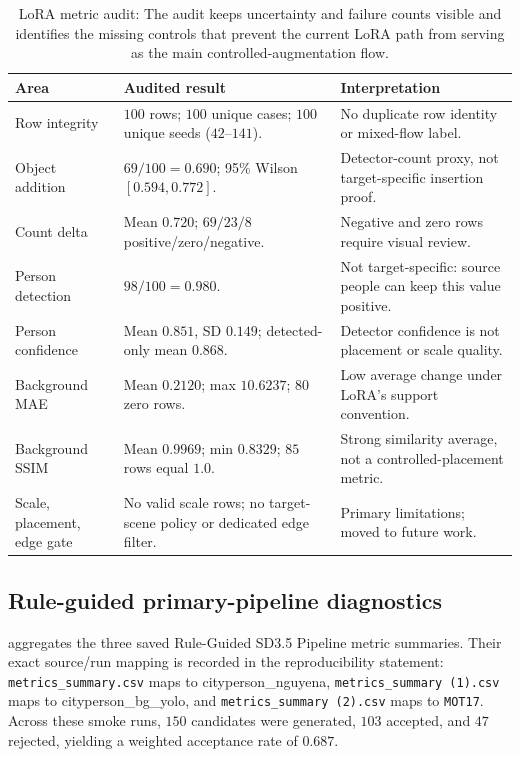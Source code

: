 \documentclass[11pt,a4paper]{article}
\newcommand{\rgp}{Rule-Guided SD3.5 Pipeline\xspace}  %
\begin{document}
\begin{table}[t]
  \centering
  \caption[Audited LoRA shared metrics]{{LoRA metric audit:} The audit keeps uncertainty and failure counts visible and identifies the missing controls that prevent the current LoRA path from serving as the main controlled-augmentation flow.}
  \label{tab:lora-audit}
  \scriptsize
  \begin{tabular}{@{}p{2.55cm}p{3.6cm}p{3.55cm}@{}}
    \toprule
    \textbf{Area} & \textbf{Audited result} & \textbf{Interpretation} \\
    \midrule
    Row integrity & $100$ rows; $100$ unique cases; $100$ unique seeds ($42$--$141$). & No duplicate row identity or mixed-flow label. \\
    Object addition & $69/100=0.690$; 95\% Wilson $[0.594,0.772]$. & Detector-count proxy, not target-specific insertion proof. \\
    Count delta & Mean $0.720$; $69/23/8$ positive/zero/negative. & Negative and zero rows require visual review. \\
    Person detection & $98/100=0.980$. & Not target-specific: source people can keep this value positive. \\
    Person confidence & Mean $0.851$, SD $0.149$; detected-only mean $0.868$. & Detector confidence is not placement or scale quality. \\
    Background MAE & Mean $0.2120$; max $10.6237$; $80$ zero rows. & Low average change under LoRA's support convention. \\
    Background SSIM & Mean $0.9969$; min $0.8329$; $85$ rows equal $1.0$. & Strong similarity average, not a controlled-placement metric. \\
    Scale, placement, edge gate & No valid scale rows; no target-scene policy or dedicated edge filter. & Primary limitations; moved to future work. \\
    \bottomrule
  \end{tabular}
\end{table}
\subsection{Rule-guided primary-pipeline diagnostics}\label{sec:ablation}
 aggregates the three saved \rgp metric summaries. Their exact source/run mapping is recorded in the reproducibility statement: \nolinkurl{metrics_summary.csv} maps to cityperson\allowbreak\_nguyena, \nolinkurl{metrics_summary (1).csv} maps to cityperson\allowbreak\_bg\allowbreak\_yolo, and \nolinkurl{metrics_summary (2).csv} maps to \texttt{MOT17}. Across these smoke runs, $150$ candidates were generated, $103$ accepted, and $47$ rejected, yielding a weighted acceptance rate of $0.687$.
\end{document}
